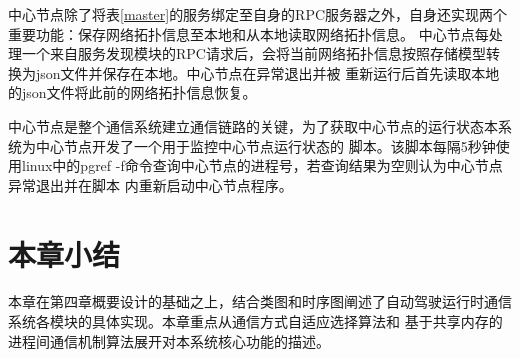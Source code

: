 
中心节点除了将表\ref{master}的服务绑定至自身的RPC服务器之外，自身还实现两个重要功能：保存网络拓扑信息至本地和从本地读取网络拓扑信息。
中心节点每处理一个来自服务发现模块的RPC请求后，会将当前网络拓扑信息按照存储模型转换为json文件并保存在本地。中心节点在异常退出并被
重新运行后首先读取本地的json文件将此前的网络拓扑信息恢复。

中心节点是整个通信系统建立通信链路的关键，为了获取中心节点的运行状态本系统为中心节点开发了一个用于监控中心节点运行状态的
脚本。该脚本每隔5秒钟使用linux中的pgref -f命令查询中心节点的进程号，若查询结果为空则认为中心节点异常退出并在脚本
内重新启动中心节点程序。

\section{本章小结}
本章在第四章概要设计的基础之上，结合类图和时序图阐述了自动驾驶运行时通信系统各模块的具体实现。本章重点从通信方式自适应选择算法和
基于共享内存的进程间通信机制算法展开对本系统核心功能的描述。


